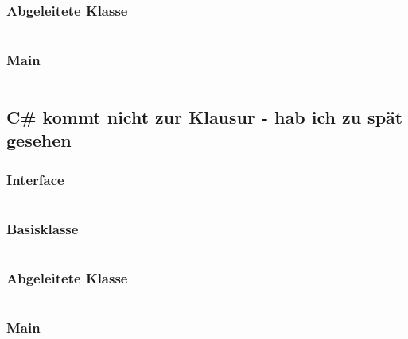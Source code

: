 \documentclass[12pt]{scrartcl}
\begin{document}
\subsubsection{Abgeleitete Klasse}
\inputminted{java}{java/src/main/java/javademo/Derivedclass.java}
\subsubsection{Main}
\inputminted{java}{java/src/main/java/javademo/Demo.java}
\pagebreak

\subsection{C\# kommt nicht zur Klausur - hab ich zu spät gesehen}
\subsubsection{Interface}
\inputminted{csharp}{csharp/IInterface.cs}
\subsubsection{Basisklasse}
\inputminted{csharp}{csharp/Baseclass.cs}
\subsubsection{Abgeleitete Klasse}
\inputminted{csharp}{csharp/Derivedclass.cs}
\subsubsection{Main}
\inputminted{csharp}{csharp/Program.cs}
\pagebreak
\end{document}
